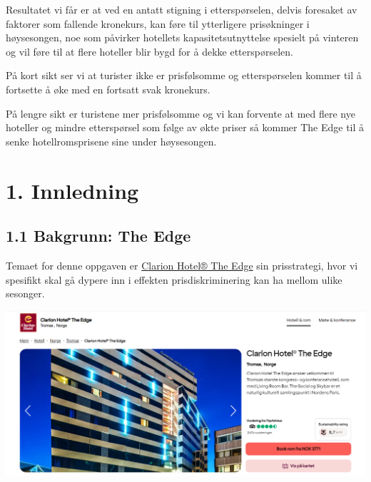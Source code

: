 \documentclass[
  12pt,
  a4paper,
  DIV=11,
  numbers=noendperiod]{scrartcl}
\renewcommand*\contentsname{Table of contents}
\newcommand\contentsname{Table of contents}
\begin{document}
Resultatet vi får er at ved en antatt stigning i etterspørselen, delvis foresaket av faktorer som fallende kronekurs, kan føre til ytterligere prisøkninger i høysesongen, noe som påvirker hotellets kapasitetsutnyttelse spesielt på vinteren og vil føre til at flere hoteller blir bygd for å dekke etterspørselen.

På kort sikt ser vi at turister ikke er prisfølsomme og etterspørselen kommer til å fortsette å øke med en fortsatt svak kronekurs.

På lengre sikt er turistene mer prisfølsomme og vi kan forvente at med flere nye hoteller og mindre etterspørsel som følge av økte priser så kommer The Edge til å senke hotellromsprisene sine under høysesongen.



\newpage
\hypersetup{linkcolor=black}
\renewcommand{\contentsname}{Innholdsfortegnelse}
\renewcommand*{\figureautorefname}{Figur}
\renewcommand*{\tableautorefname}{Tabell}
\tableofcontents
\newpage
\listoffigures
\listoftables
\hypersetup{linkcolor=blue}
\newpage

\section{1. Innledning}\label{innledning}

\subsection{1.1 Bakgrunn: The Edge}\label{bakgrunn-the-edge}

Temaet for denne oppgaven er
\href{https://www.strawberry.no/hotell/norge/tromso/clarion-hotel-the-edge/}{Clarion
Hotel® The Edge} sin prisstrategi, hvor vi spesifikt skal gå dypere inn
i effekten prisdiskriminering kan ha mellom ulike sesonger.

\includegraphics{dokumentobjekter/figurer/the_edge.png}
\end{document}
